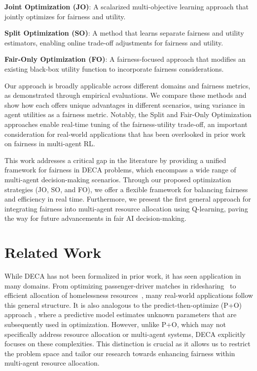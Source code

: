 \squishlist
\item \textbf{Joint Optimization (JO)}: A scalarized multi-objective learning approach that jointly optimizes for fairness and utility.
\item \textbf{Split Optimization (SO)}: A method that learns separate fairness and utility estimators, enabling online trade-off adjustments for fairness and utility.
\item \textbf{Fair-Only Optimization (FO)}: A fairness-focused approach that modifies an existing black-box utility function to incorporate fairness considerations.
\squishend

Our approach is broadly applicable across different domains and fairness metrics, as demonstrated through empirical evaluations. We compare these methods and show how each offers unique advantages in different scenarios, using variance in agent utilities as a fairness metric. Notably, the Split and Fair-Only Optimization approaches enable real-time tuning of the fairness-utility trade-off, an important consideration for real-world applications that has been overlooked in prior work on fairness in multi-agent RL.

This work addresses a critical gap in the literature by providing a unified framework for fairness in DECA problems, which encompass a wide range of multi-agent decision-making scenarios. Through our proposed optimization strategies (JO, SO, and FO), we offer a flexible framework for balancing fairness and efficiency in real time. Furthermore, we present the first general approach for integrating fairness into multi-agent resource allocation using Q-learning, paving the way for future advancements in fair AI decision-making.


\section{Related Work}
\label{sec:related}

While DECA has not been formalized in prior work, it has seen application in many domains. From optimizing passenger-driver matches in ridesharing~\citep{shah2020neural, qin2022RLforRides} to efficient allocation of homelessness resources~\citep{kube2019allocating, kube2023community}, many real-world applications follow this general structure. 
It is also analogous to the predict-then-optimize (P+O) approach \citep{wang2021PtO, elmachtoub2022smartPtO}, where a predictive model estimates unknown parameters that are subsequently used in optimization. However, unlike P+O, which may not specifically address resource allocation or multi-agent systems, DECA explicitly focuses on these complexities. This distinction is crucial as it allows us to restrict the problem space and tailor our research towards enhancing fairness within multi-agent resource allocation.

